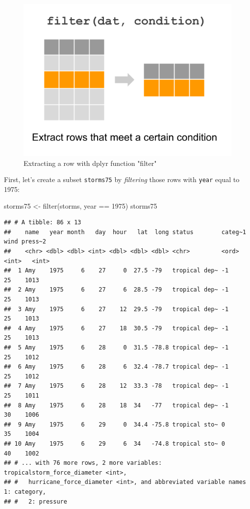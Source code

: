 \documentclass[
]{book}
\newenvironment{Shaded}{\begin{snugshade}}{\end{snugshade}}
\newcommand{\DecValTok}[1]{\textcolor[rgb]{0.00,0.00,0.81}{#1}}
\newcommand{\FunctionTok}[1]{\textcolor[rgb]{0.00,0.00,0.00}{#1}}
\newcommand{\NormalTok}[1]{#1}
\newcommand{\OtherTok}[1]{\textcolor[rgb]{0.56,0.35,0.01}{#1}}
\newcommand{\SpecialCharTok}[1]{\textcolor[rgb]{0.00,0.00,0.00}{#1}}
\begin{document}
\begin{figure}

{\centering \includegraphics[width=0.4\linewidth]{images/dplyr-filter} 

}

\caption{Extracting a row with dplyr function "filter"}\label{fig:unnamed-chunk-12}
\end{figure}

First, let's create a subset \texttt{storms75} by \emph{filtering} those rows with \texttt{year}
equal to 1975:

\begin{Shaded}
\begin{Highlighting}[]
\NormalTok{storms75 }\OtherTok{\textless{}{-}} \FunctionTok{filter}\NormalTok{(storms, year }\SpecialCharTok{==} \DecValTok{1975}\NormalTok{)}
\NormalTok{storms75}
\end{Highlighting}
\end{Shaded}

\begin{verbatim}
## # A tibble: 86 x 13
##    name   year month   day  hour   lat  long status        categ~1  wind press~2
##    <chr> <dbl> <dbl> <int> <dbl> <dbl> <dbl> <chr>         <ord>   <int>   <int>
##  1 Amy    1975     6    27     0  27.5 -79   tropical dep~ -1         25    1013
##  2 Amy    1975     6    27     6  28.5 -79   tropical dep~ -1         25    1013
##  3 Amy    1975     6    27    12  29.5 -79   tropical dep~ -1         25    1013
##  4 Amy    1975     6    27    18  30.5 -79   tropical dep~ -1         25    1013
##  5 Amy    1975     6    28     0  31.5 -78.8 tropical dep~ -1         25    1012
##  6 Amy    1975     6    28     6  32.4 -78.7 tropical dep~ -1         25    1012
##  7 Amy    1975     6    28    12  33.3 -78   tropical dep~ -1         25    1011
##  8 Amy    1975     6    28    18  34   -77   tropical dep~ -1         30    1006
##  9 Amy    1975     6    29     0  34.4 -75.8 tropical sto~ 0          35    1004
## 10 Amy    1975     6    29     6  34   -74.8 tropical sto~ 0          40    1002
## # ... with 76 more rows, 2 more variables: tropicalstorm_force_diameter <int>,
## #   hurricane_force_diameter <int>, and abbreviated variable names 1: category,
## #   2: pressure
\end{verbatim}
\end{document}
